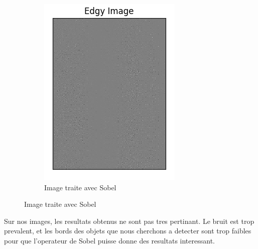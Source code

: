 \documentclass[a4paper, 12pt, titlepage, oneside]{article}
\begin{document}
\begin{figure}[!h]
\begin{subfigure}[b]{0.4\linewidth}
			\includegraphics[width=\linewidth]{Sobel1a.png}
			\caption{Image traite avec Sobel}
		\end{subfigure}
		\label{fig:OurSobel}
	\end{figure}

	Sur nos images, les resultats obtenus ne sont pas tres pertinant. Le bruit est trop prevalent, et les bords des objets que nous cherchons a detecter sont trop faibles pour que l'operateur de Sobel puisse donne des resultats interessant.
	
\end{document}
